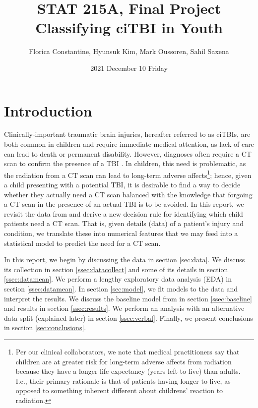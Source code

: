 \documentclass[11pt, letterpaper]{amsart}
\title{STAT 215A, Final Project\\Classifying ciTBI in Youth}
\author{Florica Constantine, Hyunsuk Kim, Mark Oussoren, Sahil Saxena}
\date{2021 December 10 Friday}
\let\Oldsection\section
\renewcommand{\section}{\FloatBarrier\Oldsection}
\begin{document}
\maketitle

\section{Introduction}


Clinically-important traumatic brain injuries, hereafter referred to as ciTBIs, are both common in children and require immediate medical attention, as lack of care can lead to death or permanent disability. However, diagnoses often require a CT scan to confirm the presence of a TBI \cite{brenner2002estimating}. In children, this need is problematic, as the radiation from a CT scan can lead to long-term adverse affects\footnote{Per our clinical collaborators, we note that medical practitioners say that children are at greater risk for long-term adverse affects from radiation because they have a longer life expectancy (years left to live) than adults. I.e., their primary rationale is that of patients having longer to live, as opposed to something inherent different about childrens' reaction to radiation.}; hence, given a child presenting with a potential TBI, it is desirable to find a way to decide whether they actually need a CT scan balanced with the knowledge that forgoing a CT scan in the presence of an actual TBI is to be avoided. In this report, we revisit the data from \cite{kuppermann2009identification} and derive a new decision rule for identifying which child patients need a CT scan. That is, given details (data) of a patient's injury and condition, we translate these into numerical features that we may feed into a statistical model to predict the need for a CT scan. 

In this report, we begin by discussing the data in section \ref{sec:data}. We discuss its collection in section \ref{ssec:datacollect} and some of its details in section \ref{ssec:datamean}. We perform a lengthy exploratory data analysis (EDA) in section \ref{ssec:datamean}. In section \ref{sec:model}, we fit models to the data and interpret the results. We discuss the baseline model from \cite{kuppermann2009identification} in section \ref{ssec:baseline} and results in section \ref{ssec:results}. We perform an analysis with an alternative data split (explained later) in section \ref{ssec:verbal}. Finally, we present conclusions in section \ref{sec:conclusions}. 
\end{document}
